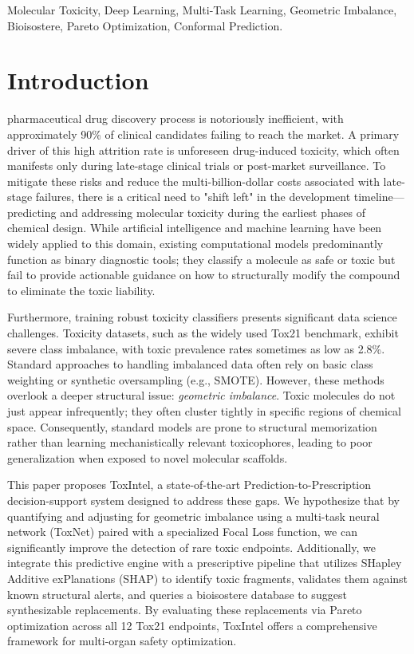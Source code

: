 \documentclass[lettersize,journal]{IEEEtran}
\begin{document}
\begin{IEEEkeywords}
Molecular Toxicity, Deep Learning, Multi-Task Learning, Geometric Imbalance, Bioisostere, Pareto Optimization, Conformal Prediction.
\end{IEEEkeywords}

\section{Introduction}
 pharmaceutical drug discovery process is notoriously inefficient, with approximately 90\% of clinical candidates failing to reach the market. A primary driver of this high attrition rate is unforeseen drug-induced toxicity, which often manifests only during late-stage clinical trials or post-market surveillance. To mitigate these risks and reduce the multi-billion-dollar costs associated with late-stage failures, there is a critical need to "shift left" in the development timeline—predicting and addressing molecular toxicity during the earliest phases of chemical design. While artificial intelligence and machine learning have been widely applied to this domain, existing computational models predominantly function as binary diagnostic tools; they classify a molecule as safe or toxic but fail to provide actionable guidance on how to structurally modify the compound to eliminate the toxic liability.

Furthermore, training robust toxicity classifiers presents significant data science challenges. Toxicity datasets, such as the widely used Tox21 benchmark, exhibit severe class imbalance, with toxic prevalence rates sometimes as low as 2.8\%. Standard approaches to handling imbalanced data often rely on basic class weighting or synthetic oversampling (e.g., SMOTE). However, these methods overlook a deeper structural issue: \textit{geometric imbalance}. Toxic molecules do not just appear infrequently; they often cluster tightly in specific regions of chemical space. Consequently, standard models are prone to structural memorization rather than learning mechanistically relevant toxicophores, leading to poor generalization when exposed to novel molecular scaffolds.

This paper proposes ToxIntel, a state-of-the-art Prediction-to-Prescription decision-support system designed to address these gaps. We hypothesize that by quantifying and adjusting for geometric imbalance using a multi-task neural network (ToxNet) paired with a specialized Focal Loss function, we can significantly improve the detection of rare toxic endpoints. Additionally, we integrate this predictive engine with a prescriptive pipeline that utilizes SHapley Additive exPlanations (SHAP) to identify toxic fragments, validates them against known structural alerts, and queries a bioisostere database to suggest synthesizable replacements. By evaluating these replacements via Pareto optimization across all 12 Tox21 endpoints, ToxIntel offers a comprehensive framework for multi-organ safety optimization.
\end{document}
